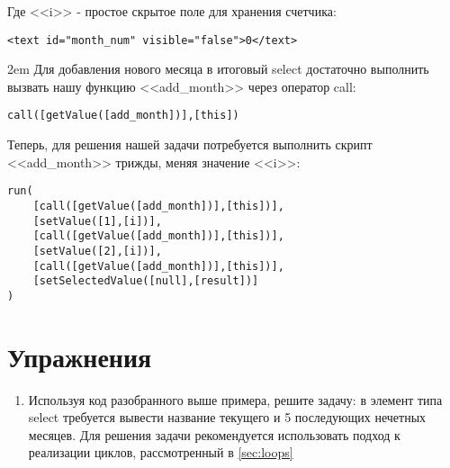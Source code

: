 \documentclass[../index.tex]{subfiles}
\begin{document}
Где <<i>> - простое скрытое поле для хранения счетчика:
\begin{verbatim}
<text id="month_num" visible="false">0</text>
\end{verbatim}
\emergencystretch 2em
Для добавления нового месяца в итоговый select достаточно выполнить вызвать нашу функцию <<add\_month>> через оператор call: 

\begin{verbatim}
call([getValue([add_month])],[this])
\end{verbatim}

Теперь, для решения нашей задачи потребуется выполнить скрипт <<add\_month>> трижды, меняя значение <<i>>:

\begin{verbatim}
run(
    [call([getValue([add_month])],[this])],
    [setValue([1],[i])],
    [call([getValue([add_month])],[this])],
    [setValue([2],[i])],
    [call([getValue([add_month])],[this])],
    [setSelectedValue([null],[result])]
)
\end{verbatim}

\section{Упражнения}
    \begin{enumerate}
        \item Используя код разобранного выше примера, решите задачу: в элемент типа select требуется вывести название текущего и 5 последующих нечетных месяцев. Для решения задачи рекомендуется использовать подход к реализации циклов, рассмотренный в  \autoref{sec:loops}            
    \end{enumerate}
\end{document}
